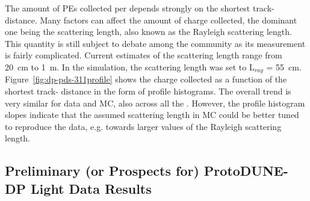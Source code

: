 
The amount of PEs collected per  depends strongly on the shortest track- distance. Many factors can affect the amount of charge collected, the dominant one being the scattering length, also known as the Rayleigh scattering length. This quantity is still subject to debate among the  community as its measurement is fairly complicated. Current estimates of the scattering length range from \SI{20}{\cm} to \SI{1}{\m}.
In the  simulation, the scattering length was set to L$_{ray}$ = \SI{55}{\cm}.
Figure~\ref{fig:dp-pds-311profile} shows the charge collected as a function of the shortest track- distance in the form of profile histograms. The overall trend is very similar for data and MC, also across all the . However, the profile histogram slopes indicate that the assumed scattering length in MC could be better tuned to reproduce the data, e.g. towards larger values of the Rayleigh scattering length.


\subsection{Preliminary (or Prospects for) ProtoDUNE-DP Light Data Results}

